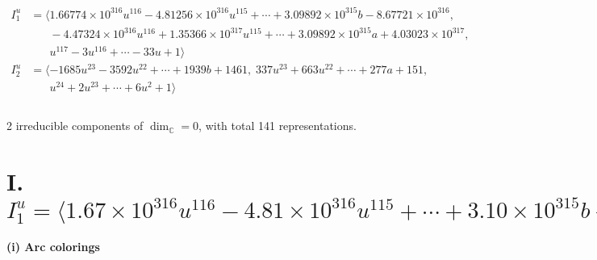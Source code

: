 \documentclass[1p]{elsarticle_modified}
\theoremstyle{definition}
\begin{document}
\begin{align*}
I^u_{1}&=\langle 
1.66774\times10^{316} u^{116}-4.81256\times10^{316} u^{115}+\cdots+3.09892\times10^{315} b-8.67721\times10^{316},\\
\phantom{I^u_{1}}&\phantom{= \langle  }-4.47324\times10^{316} u^{116}+1.35366\times10^{317} u^{115}+\cdots+3.09892\times10^{315} a+4.03023\times10^{317},\\
\phantom{I^u_{1}}&\phantom{= \langle  }u^{117}-3 u^{116}+\cdots-33 u+1\rangle \\
I^u_{2}&=\langle 
-1685 u^{23}-3592 u^{22}+\cdots+1939 b+1461,\;337 u^{23}+663 u^{22}+\cdots+277 a+151,\\
\phantom{I^u_{2}}&\phantom{= \langle  }u^{24}+2 u^{23}+\cdots+6 u^2+1\rangle \\
\\
\end{align*}
\raggedright * 2 irreducible components of $\dim_{\mathbb{C}}=0$, with total 141 representations.\\
\newpage
\renewcommand{\arraystretch}{1}
\centering \section*{I. $I^u_{1}= \langle 1.67\times10^{316} u^{116}-4.81\times10^{316} u^{115}+\cdots+3.10\times10^{315} b-8.68\times10^{316},\;-4.47\times10^{316} u^{116}+1.35\times10^{317} u^{115}+\cdots+3.10\times10^{315} a+4.03\times10^{317},\;u^{117}-3 u^{116}+\cdots-33 u+1 \rangle$}
\flushleft \textbf{(i) Arc colorings}\\
\end{document}
